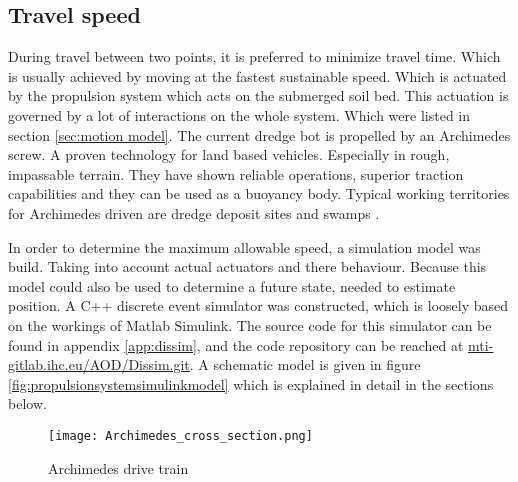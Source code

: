 \subsection{Travel speed}
During travel between two points, it is preferred to minimize travel time. Which is usually achieved by moving at the fastest sustainable speed. Which is actuated by the propulsion system which acts on the submerged soil bed. This actuation is governed by a lot of interactions on the whole system. Which were listed in section \ref{sec:motion model}. The current dredge bot is propelled by an Archimedes screw. A proven technology for land based vehicles. Especially in rough, impassable terrain. They have shown reliable operations, superior traction capabilities and they can be used as a buoyancy body. Typical working territories for Archimedes driven are dredge deposit sites and swamps \citet{lotman_deep_2011}.

In order to determine the maximum allowable speed, a simulation model was build. Taking into account actual actuators and there behaviour. Because this model could also be used to determine a future state, needed to estimate position. A C++ discrete event simulator was constructed, which is loosely based on the workings of Matlab Simulink. The source code for this simulator can be found in appendix \ref{app:dissim}, and the code repository can be reached at \href{http://mti-gitlab.ihc.eu/AOD/Dissim.git}{mti-gitlab.ihc.eu/AOD/Dissim.git}. A schematic model is given in figure \ref{fig:propulsionsystemsimulinkmodel} which is explained in detail in the sections below.
\begin{figure}[!htb]
	\texttt{[image: Archimedes\_cross\_section.png]}
	\caption{Archimedes drive train}
\end{figure}

